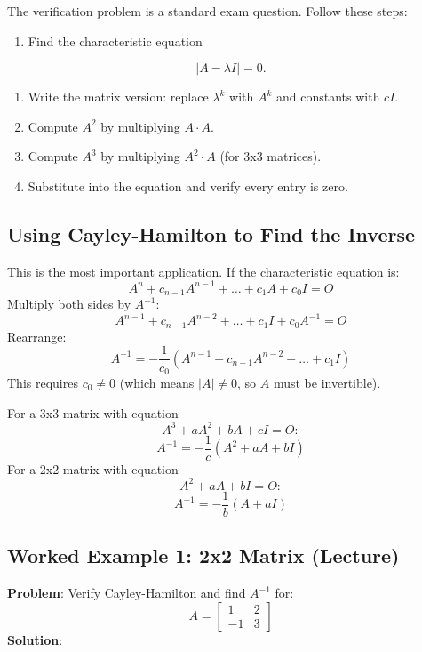 \documentclass[
]{article}
\providecommand{\tightlist}{%
  \setlength{\itemsep}{0pt}\setlength{\parskip}{0pt}}
\begin{document}
The verification problem is a standard exam question. Follow these
steps:

\begin{enumerate}
\def\labelenumi{\arabic{enumi}.}
\tightlist
\item
  Find the characteristic equation
\end{enumerate}
\[
\lvert A - \lambda I \rvert = 0.
\]
\begin{enumerate}
\def\labelenumi{\arabic{enumi}.}
\setcounter{enumi}{1}
\tightlist
\item
  Write the matrix version: replace \(\lambda^k\) with \(A^k\) and
  constants with \(cI\).
\item
  Compute \(A^2\) by multiplying \(A \cdot A\).
\item
  Compute \(A^3\) by multiplying \(A^2 \cdot A\) (for 3x3 matrices).
\item
  Substitute into the equation and verify every entry is zero.
\end{enumerate}

\subsection{Using Cayley-Hamilton to Find the
Inverse}\label{using-cayley-hamilton-to-find-the-inverse}

This is the most important application. If the characteristic equation
is:
\[
A^n + c_{n-1}A^{n-1} + \dots + c_1 A + c_0 I = O
\]
Multiply both sides by \(A^{-1}\):
\[
A^{n-1} + c_{n-1}A^{n-2} + \dots + c_1 I + c_0 A^{-1} = O
\]
Rearrange:
\[
A^{-1} = -\frac{1}{c_0}\left(A^{n-1} + c_{n-1}A^{n-2} + \dots + c_1 I\right)
\]
This requires \(c_0 \neq 0\) (which means \(\lvert A \rvert \neq 0\), so
\(A\) must be invertible).

For a 3x3 matrix with equation
\[
A^3 + aA^2 + bA + cI = O:
\]
\[
A^{-1} = -\frac{1}{c}(A^2 + aA + bI)
\]
For a 2x2 matrix with equation
\[
A^2 + aA + bI = O:
\]
\[
A^{-1} = -\frac{1}{b}(A + aI)
\]

\subsection{Worked Example 1: 2x2 Matrix
(Lecture)}\label{worked-example-1-2x2-matrix-lecture}

\textbf{Problem}: Verify Cayley-Hamilton and find \(A^{-1}\) for:
\[
A =
\begin{bmatrix}
1 & 2 \\
-1 & 3
\end{bmatrix}
\]
\textbf{Solution}:
\end{document}
